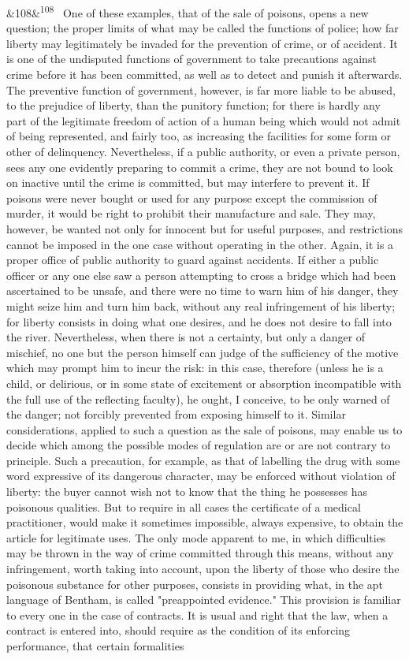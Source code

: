 \documentclass[12pt]{article}
\newcommand{\para}[1][]{\par\noindent\ifx&#1&\else\textsuperscript{\footnotesize #1}~\fi}
\begin{document}
\para[108] One of these examples, that of the sale of poisons, opens a new question; the proper limits of what may be called the functions of police; how far liberty may legitimately be invaded for the prevention of crime, or of accident. It is one of the undisputed functions of government to take precautions against crime before it has been committed, as well as to detect and punish it afterwards. The preventive function of government, however, is far more liable to be abused, to the prejudice of liberty, than the punitory function; for there is hardly any part of the legitimate freedom of action of a human being which would not admit of being represented, and fairly too, as increasing the facilities for some form or other of delinquency. Nevertheless, if a public authority, or even a private person, sees any one evidently preparing to commit a crime, they are not bound to look on inactive until the crime is committed, but may interfere to prevent it. If poisons were never bought or used for any purpose except the commission of murder, it would be right to prohibit their manufacture and sale. They may, however, be wanted not only for innocent but for useful purposes, and restrictions cannot be imposed in the one case without operating in the other. Again, it is a proper office of public authority to guard against accidents. If either a public officer or any one else saw a person attempting to cross a bridge which had been ascertained to be unsafe, and there were no time to warn him of his danger, they might seize him and turn him back, without any real infringement of his liberty; for liberty consists in doing what one desires, and he does not desire to fall into the river. Nevertheless, when there is not a certainty, but only a danger of mischief, no one but the person himself can judge of the sufficiency of the motive which may prompt him to incur the risk: in this case, therefore (unless he is a child, or delirious, or in some state of excitement or absorption incompatible with the full use of the reflecting faculty), he ought, I conceive, to be only warned of the danger; not forcibly prevented from exposing himself to it. Similar considerations, applied to such a question as the sale of poisons, may enable us to decide which among the possible modes of regulation are or are not contrary to principle. Such a precaution, for example, as that of labelling the drug with some word expressive of its dangerous character, may be enforced without violation of liberty: the buyer cannot wish not to know that the thing he possesses has poisonous qualities. But to require in all cases the certificate of a medical practitioner, would make it sometimes impossible, always expensive, to obtain the article for legitimate uses. The only mode apparent to me, in which difficulties may be thrown in the way of crime committed through this means, without any infringement, worth taking into account, upon the liberty of those who desire the poisonous substance for other purposes, consists in providing what, in the apt language of Bentham, is called "preappointed evidence." This provision is familiar to every one in the case of contracts. It is usual and right that the law, when a contract is entered into, should require as the condition of its enforcing performance, that certain formalities 
\end{document}
